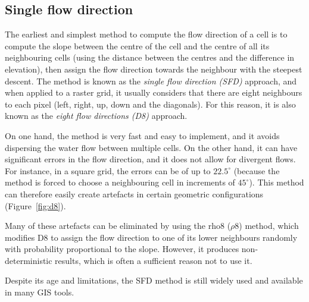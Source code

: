 \subsection{Single flow direction}


The earliest and simplest method to compute the flow direction of a cell is to compute the slope between the centre of the cell and the centre of all its neighbouring cells (using the distance between the centres and the difference in elevation), then assign the flow direction towards the neighbour with the steepest descent.
The method is known as the \emph{single flow direction (SFD)} approach, 
and when applied to a raster grid, it usually considers that there are eight neighbours to each pixel (left, right, up, down and the diagonals).
For this reason, it is also known as the \emph{eight flow directions (D8)} approach.

On one hand, the method is very fast and easy to implement, and it avoids dispersing the water flow between multiple cells.
On the other hand, it can have significant errors in the flow direction, and it does not allow for divergent flows.
For instance, in a square grid, the errors can be of up to \(22.5^\circ{}\) (because the method is forced to choose a neighbouring cell in increments of \(45^\circ{}\)).
This method can therefore easily create artefacts in certain geometric configurations (Figure~\ref{fig:d8}).

Many of these artefacts can be eliminated by using the rho8 (\(\rho8\)) method, which modifies D8 to assign the flow direction to one of its lower neighbours randomly with probability proportional to the slope.
However, it produces non-deterministic results, which is often a sufficient reason not to use it.

Despite its age and limitations, the SFD method is still widely used and available in many GIS tools\@.

